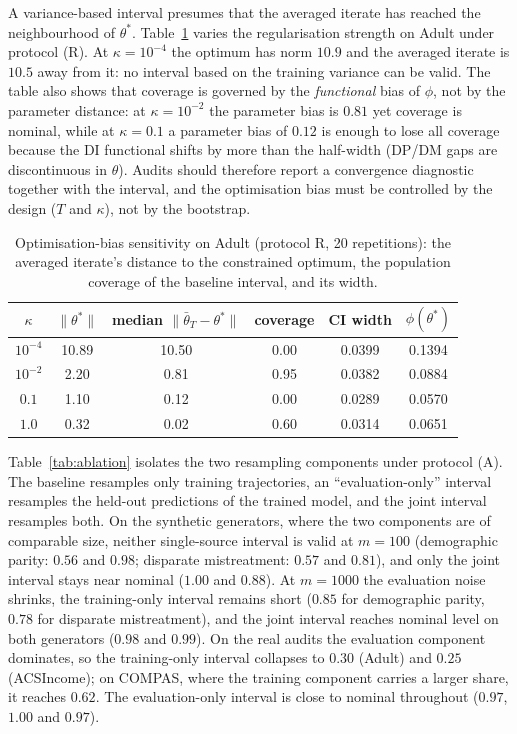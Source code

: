 \documentclass[pdflatex,sn-basic]{sn-jnl}
\newcommand{\tbar}{\bar\theta}
\begin{document}

\label{par:bias}
A variance-based interval presumes that the averaged iterate has reached the neighbourhood of
$\theta^*$.  Table~\ref{tab:sensitivity} varies the regularisation strength on Adult under protocol
(R).  At $\kappa=10^{-4}$ the optimum has norm $10.9$ and the averaged iterate is $10.5$ away from
it: no interval based on the training variance can be valid.  The table also shows that coverage is
governed by the \emph{functional} bias of $\phi$, not by the parameter distance: at $\kappa=10^{-2}$
the parameter bias is $0.81$ yet coverage is nominal, while at $\kappa=0.1$ a parameter bias of
$0.12$ is enough to lose all coverage because the DI functional shifts by more than the half-width
(DP/DM gaps are discontinuous in $\theta$).  Audits should therefore report a convergence diagnostic
together with the interval, and the optimisation bias must be controlled by the design ($T$ and
$\kappa$), not by the bootstrap.

\begin{table}[t]
\centering
\caption{Optimisation-bias sensitivity on Adult (protocol R, 20 repetitions): the averaged iterate's
distance to the constrained optimum, the population coverage of the baseline interval, and its width.}
\label{tab:sensitivity}
\begin{tabular}{cccccc}
\toprule
$\kappa$ & $\|\theta^*\|$ & median $\|\tbar_T-\theta^*\|$ & coverage & CI width & $\phi(\theta^*)$ \\
\midrule
$10^{-4}$ & 10.89 & 10.50 & 0.00 & 0.0399 & 0.1394 \\
$10^{-2}$ & 2.20  & 0.81  & 0.95 & 0.0382 & 0.0884 \\
$0.1$     & 1.10  & 0.12  & 0.00 & 0.0289 & 0.0570 \\
$1.0$     & 0.32  & 0.02  & 0.60 & 0.0314 & 0.0651 \\
\bottomrule
\end{tabular}
\end{table}


Table~\ref{tab:ablation} isolates the two resampling components under protocol (A).  The baseline
resamples only training trajectories, an ``evaluation-only'' interval resamples the held-out
predictions of the trained model, and the joint interval resamples both.  On the synthetic generators,
where the two components are of comparable size, neither single-source interval is valid at $m=100$
(demographic parity: $0.56$ and $0.98$; disparate mistreatment: $0.57$ and $0.81$), and only the joint
interval stays near nominal ($1.00$ and $0.88$).  At $m=1000$ the evaluation noise shrinks, the
training-only interval remains short ($0.85$ for demographic parity, $0.78$ for disparate mistreatment),
and the joint interval reaches nominal level on both generators ($0.98$ and $0.99$).  On the real
audits the evaluation component dominates, so the training-only interval collapses to $0.30$ (Adult)
and $0.25$ (ACSIncome); on COMPAS, where the training component carries a larger share, it reaches
$0.62$.  The evaluation-only interval is close to nominal throughout ($0.97$, $1.00$ and $0.97$).
\end{document}
